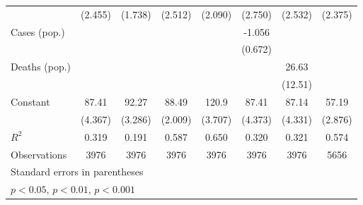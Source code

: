 \documentclass{article}
\begin{document}
{\begin{longtable}{l*{7}{c}}
                &  (2.455)         &  (1.738)         &  (2.512)         &  (2.090)         &  (2.750)         &  (2.532)         &  (2.375)         \\
Cases (pop.)    &                  &                  &                  &                  &   -1.056         &                  &                  \\
                &                  &                  &                  &                  &  (0.672)         &                  &                  \\
Deaths (pop.)   &                  &                  &                  &                  &                  &    26.63\sym{*}  &                  \\
                &                  &                  &                  &                  &                  &  (12.51)         &                  \\
Constant        &    87.41\sym{***}&    92.27\sym{***}&    88.49\sym{***}&    120.9\sym{***}&    87.41\sym{***}&    87.14\sym{***}&    57.19\sym{***}\\
                &  (4.367)         &  (3.286)         &  (2.009)         &  (3.707)         &  (4.373)         &  (4.331)         &  (2.876)         \\
\hline
\(R^{2}\)       &    0.319         &    0.191         &    0.587         &    0.650         &    0.320         &    0.321         &    0.574         \\
Observations    &     3976         &     3976         &     3976         &     3976         &     3976         &     3976         &     5656         \\
\hline\hline
\multicolumn{8}{l}{\footnotesize Standard errors in parentheses}\\
\multicolumn{8}{l}{\footnotesize \sym{*} \(p<0.05\), \sym{**} \(p<0.01\), \sym{***} \(p<0.001\)}\\
\end{longtable}
}
\end{document}

